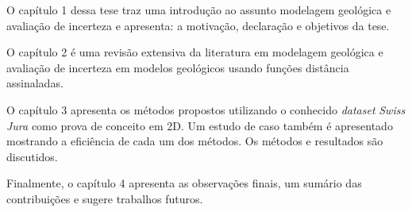 O capítulo 1 dessa tese traz uma introdução ao assunto modelagem geológica e avaliação de incerteza e apresenta: a motivação, declaração e objetivos da tese.

O capítulo 2 é uma revisão extensiva da literatura em modelagem geológica e avaliação de incerteza em modelos geológicos usando funções distância assinaladas. 

O capítulo 3 apresenta os métodos propostos utilizando o conhecido \textit{dataset} \textit{Swiss Jura} \cite{goovaerts1997geostatistics} como prova de conceito em 2D. Um estudo de caso também é apresentado mostrando a eficiência de cada um dos métodos. Os métodos e resultados são discutidos.

Finalmente, o capítulo 4 apresenta as observações finais, um sumário das contribuições e sugere trabalhos futuros.